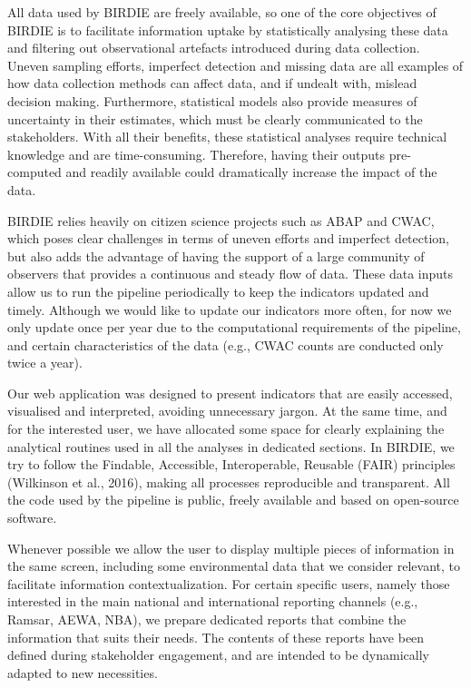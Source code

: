 \documentclass[utf8]{frontiersSCNS}
\begin{document}
All data used by BIRDIE are freely available, so one of the core
objectives of BIRDIE is to facilitate information uptake by
statistically analysing these data and filtering out observational
artefacts introduced during data collection. Uneven sampling efforts,
imperfect detection and missing data are all examples of how data
collection methods can affect data, and if undealt with, mislead
decision making. Furthermore, statistical models also provide measures
of uncertainty in their estimates, which must be clearly communicated to
the stakeholders. With all their benefits, these statistical analyses
require technical knowledge and are time-consuming. Therefore, having
their outputs pre-computed and readily available could dramatically
increase the impact of the data.

BIRDIE relies heavily on citizen science projects such as ABAP and CWAC,
which poses clear challenges in terms of uneven efforts and imperfect
detection, but also adds the advantage of having the support of a large
community of observers that provides a continuous and steady flow of
data. These data inputs allow us to run the pipeline periodically to
keep the indicators updated and timely. Although we would like to update
our indicators more often, for now we only update once per year due to
the computational requirements of the pipeline, and certain
characteristics of the data (e.g., CWAC counts are conducted only twice
a year).

Our web application was designed to present indicators that are easily
accessed, visualised and interpreted, avoiding unnecessary jargon. At
the same time, and for the interested user, we have allocated some space
for clearly explaining the analytical routines used in all the analyses
in dedicated sections. In BIRDIE, we try to follow the Findable,
Accessible, Interoperable, Reusable (FAIR) principles (Wilkinson et al.,
2016), making all processes reproducible and transparent. All the code
used by the pipeline is public, freely available and based on
open-source software.

Whenever possible we allow the user to display multiple pieces of
information in the same screen, including some environmental data that
we consider relevant, to facilitate information contextualization. For
certain specific users, namely those interested in the main national and
international reporting channels (e.g., Ramsar, AEWA, NBA), we prepare
dedicated reports that combine the information that suits their needs.
The contents of these reports have been defined during stakeholder
engagement, and are intended to be dynamically adapted to new
necessities.
\end{document}

